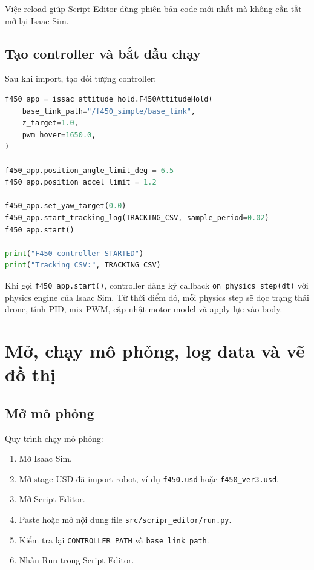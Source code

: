Việc reload giúp Script Editor dùng phiên bản code mới nhất mà không cần tắt
mở lại Isaac Sim.

\subsection{Tạo controller và bắt đầu chạy}

Sau khi import, tạo đối tượng controller:

\begin{lstlisting}[language=Python]
f450_app = issac_attitude_hold.F450AttitudeHold(
    base_link_path="/f450_simple/base_link",
    z_target=1.0,
    pwm_hover=1650.0,
)

f450_app.position_angle_limit_deg = 6.5
f450_app.position_accel_limit = 1.2

f450_app.set_yaw_target(0.0)
f450_app.start_tracking_log(TRACKING_CSV, sample_period=0.02)
f450_app.start()

print("F450 controller STARTED")
print("Tracking CSV:", TRACKING_CSV)
\end{lstlisting}

Khi gọi \texttt{f450\_app.start()}, controller đăng ký callback
\texttt{on\_physics\_step(dt)} với physics engine của Isaac Sim. Từ thời điểm
đó, mỗi physics step sẽ đọc trạng thái drone, tính PID, mix PWM, cập nhật motor
model và apply lực vào body.

\section{Mở, chạy mô phỏng, log data và vẽ đồ thị}

\subsection{Mở mô phỏng}

Quy trình chạy mô phỏng:

\begin{enumerate}
    \item Mở Isaac Sim.
    \item Mở stage USD đã import robot, ví dụ \texttt{f450.usd} hoặc
    \texttt{f450\_ver3.usd}.
    \item Mở Script Editor.
    \item Paste hoặc mở nội dung file \texttt{src/scripr\_editor/run.py}.
    \item Kiểm tra lại \texttt{CONTROLLER\_PATH} và
    \texttt{base\_link\_path}.
    \item Nhấn Run trong Script Editor.
\end{enumerate}

